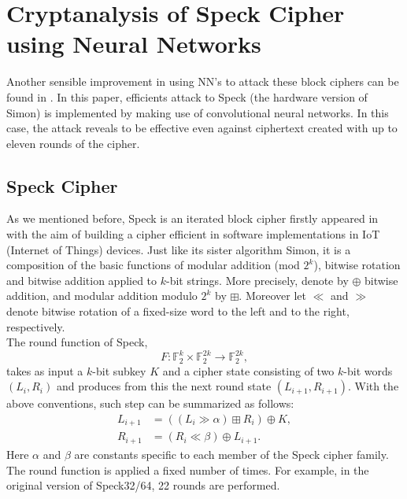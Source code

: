 \documentclass[%
    corpo=11pt,
    twoside,
    stile=classica,
    oldstyle,
    autoretitolo,
    tipotesi=magistrale,
    greek,
    evenboxes,
    english
]{toptesi}
\begin{document}
\section{Cryptanalysis of Speck Cipher using Neural Networks}
Another sensible improvement in using NN's to attack these block ciphers can be found in \citep{gohr}. In this paper, efficients attack to Speck (the hardware version of Simon) is implemented by making use of convolutional neural networks. In this case, the attack reveals to be effective even against ciphertext created with up to eleven rounds of the cipher.

\subsection{Speck Cipher}
As we mentioned before, Speck is an iterated block cipher firstly appeared in \cite{nsa} with the aim of building a cipher efficient in software implementations in IoT (Internet of Things) devices. Just like its sister algorithm Simon, it is a composition of the basic functions of modular addition (mod $2^k$), bitwise rotation and bitwise addition applied to $k$-bit strings. More precisely, denote by $\oplus$ bitwise addition, and modular addition modulo $2^k$ by $\boxplus$. Moreover let $\ll$ and $\gg$ denote bitwise rotation of a fixed-size word to the left and to the right, respectively.  \\
The round function of Speck,
\begin{equation}
F: \mathbb{F}_2^k \times \mathbb{F}_2^{2k} \longrightarrow \mathbb{F}_2^{2k},
\end{equation}
takes as input a $k$-bit subkey $K$ and a cipher state consisting of two $k$-bit words $(L_i,R_i)$ and produces from this the next round state $(L_{i+1}, R_{i+1})$. With the above conventions, such step can be summarized as follows:
\begin{align}
L_{i+1} &= \left((L_i \gg \alpha) \boxplus R_i \right) \oplus K, \\
R_{i+1} &= \left(R_i \ll \beta \right) \oplus L_{i+1}.
\end{align}
Here $\alpha$ and $\beta$ are constants specific to each member of the Speck cipher family. The round function is applied a fixed number of times. For example, in the original version of Speck32/64, 22 rounds are performed.
\end{document}
